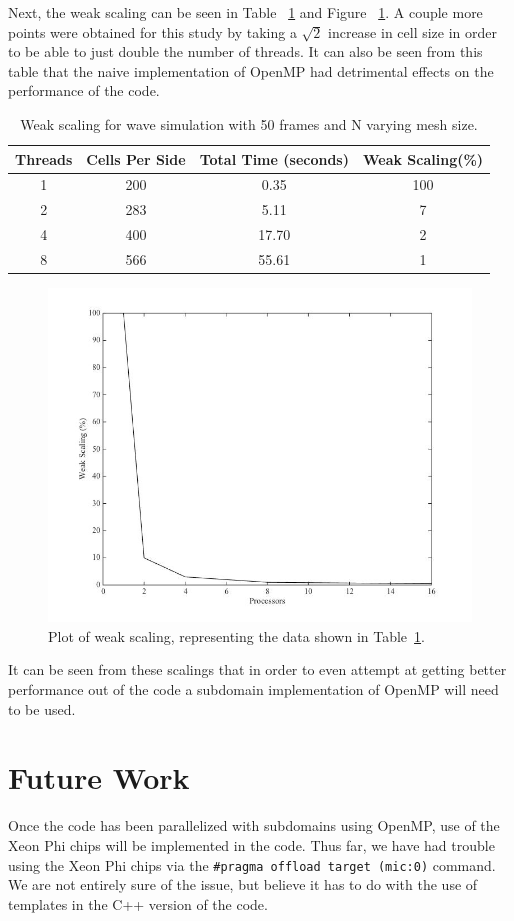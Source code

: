 \documentclass[12pt]{article}
\begin{document}
Next, the weak scaling can be seen in Table ~\ref{wscale_c} and Figure ~\ref{wsplot_c}. A couple more points were obtained for this study by taking a $\sqrt{2}$ increase in cell size in order to be able to just double the number of threads. It can also be seen from this table that the naive implementation of OpenMP had detrimental effects on the performance of the code.

\begin{table}[h]
	\begin{center}
		\begin{tabular}{|c c c c|}
			\hline
			Threads & Cells Per Side & Total Time (seconds) & Weak Scaling(\%) \\ \hline
			1 & 200 & 0.35 & 100   \\ \hline
			2 & 283 & 5.11 & 7 \\ \hline
			4 & 400 & 17.70 & 2   \\ \hline
			8 & 566 & 55.61 & 1   \\ \hline
		\end{tabular}
		\caption{Weak scaling for wave simulation with 50 frames and N varying mesh size.}
		\label{wscale_c}
	\end{center}
\end{table}

		\begin{figure}[h]
			\begin{center}
				\includegraphics[width=0.5\columnwidth]{wscale_plot}
				\caption{Plot of weak scaling, representing the data shown in Table~\ref{wscale_c}.}
				\label{wsplot_c}
			\end{center}
		\end{figure}

It can be seen from these scalings that in order to even attempt at getting better performance out of the code a subdomain implementation of OpenMP will need to be used.


\section{Future Work}
Once the code has been parallelized with subdomains using OpenMP, use of the Xeon Phi chips will be implemented in the code. Thus far, we have had trouble using the Xeon Phi chips via the \texttt{\#pragma offload target (mic:0)} command. We are not entirely sure of the issue, but believe it has to do with the use of templates in the C++ version of the code.
\end{document}
